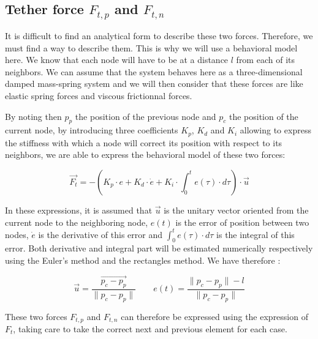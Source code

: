 \subsection{Tether force $F_{t, p}$ and $F_{t, n}$}

It is difficult to find an analytical form to describe these two forces. Therefore, we must find a way to describe them. This is why we will use a behavioral model here. We know that each node will have to be at a distance $l$ from each of its neighbors. We can assume that the system behaves here as a three-dimensional damped mass-spring system and we will then consider that these forces are like elastic spring forces and viscous frictionnal forces.

By noting then $p_{p}$ the position of the previous node and $p_{c}$ the position of the current node, by introducing three coefficients $K_p$, $K_d$ and $K_i$ allowing to express the stiffness with which a node will correct its position with respect to its neighbors, we are able to express the behavioral model of these two forces:

$$\overrightarrow{F_{t}} = - \left(K_p \cdot e + K_d \cdot \dot e + K_i \cdot \int_{0}^te(\tau) \cdot d\tau \right) \cdot \overrightarrow{u}$$

In these expressions, it is assumed that $\overrightarrow{u}$ is the unitary vector oriented from the current node to the neighboring node, $e(t)$ is the error of position between two nodes, $\dot e$ is the derivative of this error and $\int_{0}^te(\tau) \cdot d\tau$ is the integral of this error. Both derivative and integral part will be estimated numerically respectively using the Euler's method and the rectangles method. We have therefore :

$$\overrightarrow{u} = \frac{\overrightarrow{p_c - p_p}}{\|p_c - p_p\|} \qquad e(t) = \frac{\|p_c - p_p\| - l}{\|p_c - p_p\|}$$

These two forces $F_{t, p}$ and $F_{t, n}$ can therefore be expressed using the expression of $F_t$, taking care to take the correct next and previous element for each case.